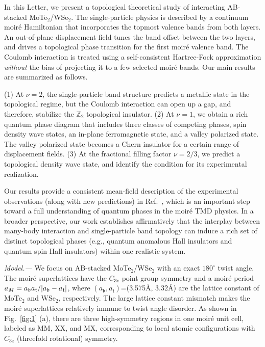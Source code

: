 \documentclass[aps,prl,twocolumn,superscriptaddress,longbibliography]{revtex4-2}
\begin{document}
In this Letter, we present a topological theoretical study of interacting AB-stacked MoTe$_2$/WSe$_2$. The single-particle physics is described by a continuum moir\'e Hamiltonian that incorporates the topmost valence bands from both layers. An out-of-plane displacement field tunes the band offset between the two layers, and drives a topological phase transition for the first moir\'e valence band. The Coulomb interaction is treated using a self-consistent Hartree-Fock approximation {\it without} the bias of projecting it to a few selected moir\'e bands. Our main results are summarized as follows.
{(1) At $\nu=2$, the single-particle band structure predicts a metallic state in the topological regime, but the Coulomb interaction can open up a gap, and therefore, stabilize the $\mathbb{Z}_2$ topological insulator. 
(2) At $\nu=1$, we obtain a rich quantum phase diagram that includes three classes of competing phases, spin density wave states, an in-plane ferromagnetic state, and a valley polarized state. The valley polarized state becomes a Chern insulator for a certain range of displacement fields. 
(3) At the fractional filling factor $\nu=2/3$, we predict a topological density wave state, and identify the condition for its experimental realization.

Our results provide a consistent mean-field description of the experimental observations (along with new predictions) in Ref.~, which is an important step toward a full understanding of quantum phases in the moir\'e TMD physics. In a broader perspective, our work establishes affirmatively that the interplay between many-body interaction and single-particle band topology can induce a rich set of distinct topological phases (e.g., quantum anomalous Hall insulators and quantum spin Hall insulators) within one realistic system.}

\textit{Model.---}
We focus on AB-stacked MoTe$_2$/WSe$_2$ with an exact $180^\circ$ twist angle. The moir\'e superlattices have the $C_{3v}$ point group symmetry and a moir\'e period $a_M=a_{\mathfrak{b}}a_{\mathfrak{t}}/\abs{a_{\mathfrak{b}}-a_{\mathfrak{t}}}$, where $(a_{\mathfrak{b}},a_{\mathfrak{t}})$=(3.575\AA, 3.32\AA) are the lattice constant of MoTe$_2$ and WSe$_2$, respectively. The large lattice constant mismatch makes the moir\'e superlattices relatively immune to twist angle disorder. As shown in Fig.~\ref{fig:1} (a), there are three high-symmetry regions in one moir\'e unit cell, labeled as MM,  XX, and MX, corresponding to  local atomic configurations with $C_{3z}$ (threefold
rotational) symmetry.
\end{document}
